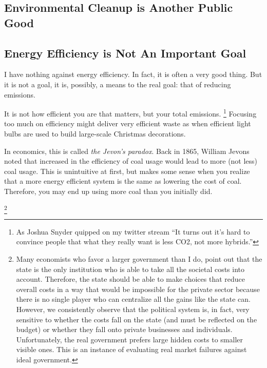 \subsection{Environmental Cleanup is Another Public Good}

\subsection{Energy Efficiency is Not An Important Goal}

I have nothing against energy efficiency. In fact, it is often a very good
thing. But it is not a goal, it is, possibly, a means to the real goal: that of
reducing emissions.

It is not how efficient you are that matters, but your total emissions.
\footnote{As Joshua Snyder quipped on my twitter stream ``It turns out it's
hard to convince people that what they really want is less CO2, not more
hybrids.''
} Focusing too much on efficiency might deliver very efficient waste as when
efficient light bulbs are used to build large-scale Christmas
decorations.

In economics, this is called \emph{the Jevon's paradox}. Back in 1865, William
Jevons noted that increased in the efficiency of coal usage would lead to more
(not less) coal usage. This is unintuitive at first, but makes some sense when
you realize that a more energy efficient system is the same as lowering the
cost of coal. Therefore, you may end up using more coal than you initially did.

\footnote{Many economists who favor a larger government than I do, point out
that the state is the only institution who is able to take all the societal
costs into account. Therefore, the state should be able to make choices that
reduce overall costs in a way that would be impossible for the private sector
because there is no single player who can centralize all the gains like the
state can. However, we consistently observe that the political system is, in
fact, very sensitive to whether the costs fall on the state (and must be
reflected on the budget) or whether they fall onto private businesses and
individuals. Unfortunately, the real government prefers large hidden costs to
smaller visible ones. This is an instance of evaluating real market failures
against ideal government.}

